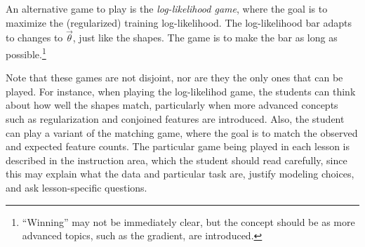 \documentclass[11pt,letterpaper]{article}
\newcommand{\Note}[1]{}
\renewcommand{\Note}[1]{\hl{[#1]}}
\newcommand{\NoteSigned}[3]{{\sethlcolor{#2}\Note{#1: #3}}}
\newcommand{\NoteFF}[1]{\NoteSigned{FF}{LightBlue}{#1}}
\begin{document}
An alternative game to play is the \textit{log-likelihood game}, where the goal is to
maximize the (regularized) training log-likelihood. The log-likelihood bar adapts to 
changes to $\vec{\theta}$, just like the shapes. The game is to make the bar as 
long as possible.\footnote{``Winning'' may not be immediately clear, but the concept should be 
as more advanced topics, such as the gradient, are introduced.}

Note that these games are not disjoint, nor are they the only ones that can be played.
For instance, when playing the log-likelihod game, the students can think about how well 
the shapes match, particularly when more advanced concepts such as regularization and conjoined features are 
introduced. Also, the student can play a variant of the matching game, where the goal
is to match the observed and expected feature counts. The particular game being played
in each lesson is described in the instruction area, which the student should
read carefully, since this may explain what the data and particular task are, justify 
modeling choices, and ask lesson-specific questions. 


\end{document}
